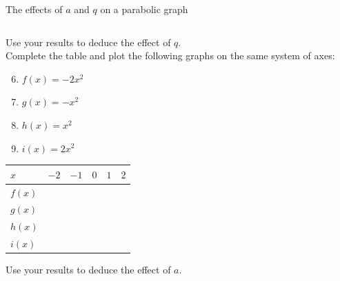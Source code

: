 \begin{Investigation}{The effects of $a$ and $q$ on a parabolic graph}
\begin{table}[H]
\begin{center}
\begin{tabular}{|l|l|l|l|l|l|}
\end{tabular}
\end{center}
\end{table}
Use your results to deduce the effect of $q$.
\\
Complete the table and plot the following graphs on the same system of axes:
    \begin{enumerate}[noitemsep, label=\textbf{\arabic*}. ] 
\setcounter{enumi}{5}
  \item $f(x)=-2{x}^{2}$
    \item $g(x)=-{x}^{2}$
    \item $h(x)={x}^{2}$
    \item $i(x)=2{x}^{2}$
    \end{enumerate}
\begin{table}[H]
\begin{center}
\begin{tabular}{|l|l|l|l|l|l|}\hline
$x$&
$-2$&
$-1$&
$0$&
$1$&
$2$
\\ \hline

$f(x)$&
&
&
&
&
\\ \hline

$g(x)$&
&
&
&
&
\\ \hline


$h(x)$
&
&
&
&
&
\\ \hline

$i(x)$
&
&
&
&
&
\\ \hline

\end{tabular}
\end{center}
\end{table}

Use your results to deduce the effect of $a$.

\end{Investigation}

